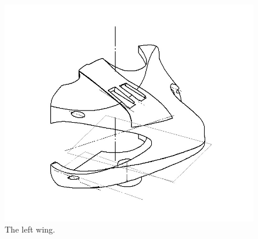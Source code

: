 \begin{figure}[!ht]
	\begin{center}
		\includegraphics[width=13.2cm]{./Images/Mechanics/LeftWing.jpg}
		\caption{The left wing.}
		\label{DatLeftWing}
	\end{center}
\end{figure}












